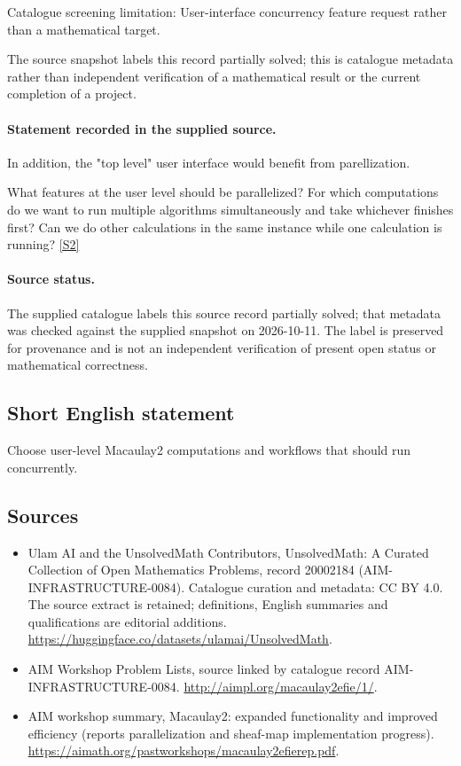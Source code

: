 \documentclass[11pt]{article}
\begin{document}
Catalogue screening limitation: User-interface concurrency feature request rather than a mathematical target.

The source snapshot labels this record partially solved; this is catalogue metadata rather than independent verification of a mathematical result or the current completion of a project.
\paragraph{Statement recorded in the supplied source.}
In addition, the "top level" user interface would benefit from parellization.

What features at the user level should be parallelized? For which computations do we want to run multiple algorithms simultaneously and take whichever finishes first? Can we do other calculations in the same instance while one calculation is running? \href{http://aimpl.org/macaulay2efie/1/}{[S2]}
\paragraph{Source status.}
The supplied catalogue labels this source record partially solved; that metadata was checked against the supplied snapshot on 2026-10-11. The label is preserved for provenance and is not an independent verification of present open status or mathematical correctness.
\subsection{Short English statement}
Choose user-level Macaulay2 computations and workflows that should run concurrently.
\subsection{Sources}
\begin{itemize}
\item[S1] Ulam AI and the UnsolvedMath Contributors, UnsolvedMath: A Curated Collection of Open Mathematics Problems, record 20002184 (AIM-INFRASTRUCTURE-0084). Catalogue curation and metadata: CC BY 4.0. The source extract is retained; definitions, English summaries and qualifications are editorial additions.
\url{https://huggingface.co/datasets/ulamai/UnsolvedMath}.
\item[S2] AIM Workshop Problem Lists, source linked by catalogue record AIM-INFRASTRUCTURE-0084.
\url{http://aimpl.org/macaulay2efie/1/}.
\item[S3] AIM workshop summary, Macaulay2: expanded functionality and improved efficiency (reports parallelization and sheaf-map implementation progress).
\url{https://aimath.org/pastworkshops/macaulay2efierep.pdf}.
\end{itemize}
\end{document}
